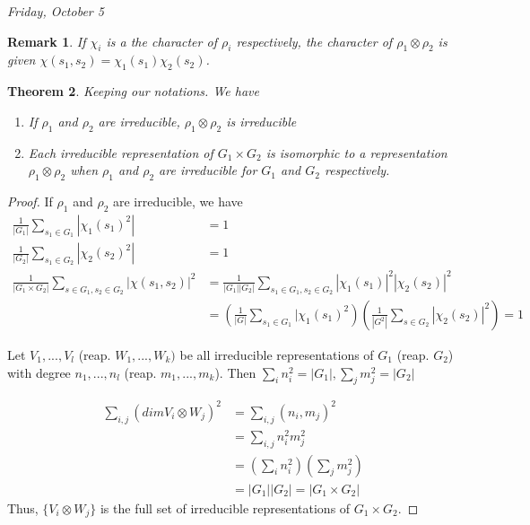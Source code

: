 \documentclass[letterpaper, leqno, 12pt]{article}
\newcommand{\fin}{\qquad \quad \hfill \framebox[1.75mm][l]{\,}}
\providecommand{\abs}[1]{\left\lvert#1\right\rvert}
\providecommand{\mbrac}[1] {\left( #1 \right)}
\theoremstyle{stdthm}
\newtheorem{thm}{Theorem}
\theoremstyle{stddef}
\newtheorem{rem}[thm]{Remark} %
\theoremstyle{stdnonum}
\theoremstyle{stdqands}
\theoremstyle{stdbold}
\begin{document}
\begin{center}
\emph{Friday, October 5}
\end{center}

\begin{rem}
If $\chi_i$ is a the character of $\rho_i$ respectively, the character of $\rho_1 \otimes \rho_2$ is given $\chi(s_1,s_2) = \chi_1(s_1)\chi_2(s_2)$. 
\end{rem}

\begin{thm} Keeping our notations. We have
\begin{enumerate}
\item If $\rho_1$ and $\rho_2$ are irreducible, $\rho_1 \otimes \rho_2$ is irreducible
\item Each irreducible representation of $G_1 \times G_2$ is isomorphic to a representation $\rho_1 \otimes \rho_2$ when $\rho_1$ and $\rho_2$ are irreducible for $G_1$ and $G_2$ respectively. 
\end{enumerate}

\end{thm}

\begin{proof}
If $\rho_1$ and $\rho_2$ are irreducible, we have 
\begin{align*}
\frac{1}{\abs{G_1}} \sum_{s_1 \in G_1} \abs{\chi_1(s_1)^2} &= 1\\
\frac{1}{\abs{G_2}} \sum_{s_1 \in G_2} \abs{\chi_2(s_2)^2} &= 1\\
\frac{1}{\abs{G_1 \times G_2}} \sum_{s\in G_1, s_2 \in G_2} \abs{\chi(s_1,s_2)}^2 &= \frac{1}{|G_1||G_2|} \sum_{s_1\in G_1,s_2 \in G_2} |\chi_1(s_1)|^2 |\chi_2(s_2)|^2\\
&= \mbrac{\frac{1}{|G|} \sum_{s_1 \in G_1} |\chi_1(s_1)^2} \mbrac{\frac{1}{|G^2|} \sum_{s\in G_2} \abs{\chi_2(s_2)}^2} = 1
\end{align*}

\noindent Let $V_1,...,V_l$ (reap. $W_1,...,W_k)$ be all irreducible representations of $G_1$ (reap. $G_2$) with degree $n_1,...,n_l$ (reap. $m_1,...,m_k$). Then $\sum_i n_i^2 = |G_1|, \sum_j m_j^2 = |G_2|$

\begin{align*}
\sum_{i,j}(dim V_i \otimes W_j)^2 &= \sum_{i,j} (n_i,m_j)^2 \\
&= \sum_{i,j} n_i^2 m_j^2\\
&= (\sum_i n_i^2)(\sum_j m_j^2)\\
&= |G_1||G_2| = |G_1 \times G_2| 
\end{align*}
Thus, $\{V_i \otimes W_j\}$ is the full set of irreducible representations of $G_1 \times G_2$. 

\end{proof}
\newpage
\end{document}
